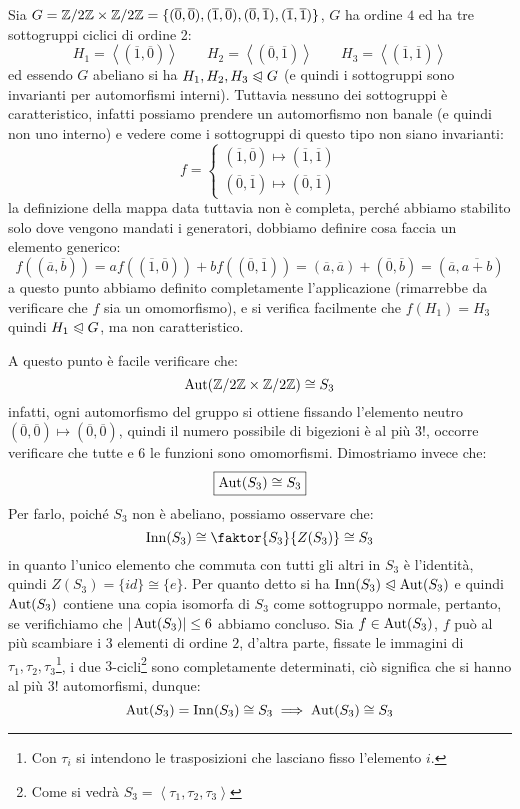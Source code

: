 \documentclass[11pt]{scrartcl}
\begin{document}
\begin{example}
    Sia $G = \mathbb{Z}/{2}\mathbb{Z} \times \mathbb{Z}/{2}\mathbb{Z} = \{(\overline 0, \overline 0),(\overline 1, \overline 0),(\overline 0, \overline 1),(\overline 1, \overline 1)\}$, $G$ ha ordine $4$ ed ha tre sottogruppi ciclici di ordine 2:
        \[ H_1 = \left<(\overline 1, \overline 0)\right> \qquad H_2 = \left<(\overline 0, \overline 1)\right> \qquad H_3 = \left<(\overline 1, \overline 1)\right>
            \] 
    ed essendo $G$ abeliano si ha $H_1,H_2,H_3 \trianglelefteqslant G$ (e quindi i sottogruppi sono invarianti per automorfismi interni). Tuttavia nessuno dei sottogruppi è caratteristico,
    infatti possiamo prendere un automorfismo non banale (e quindi non uno interno) e vedere come i sottogruppi di questo tipo non siano invarianti:
        \[ f = \begin{cases}
            (\overline 1, \overline 0) \longmapsto (\overline 1, \overline 1)\\
            (\overline 0, \overline 1) \longmapsto (\overline 0, \overline 1)
        \end{cases}
            \]
    la definizione della mappa data tuttavia non è completa, perché abbiamo stabilito solo dove vengono mandati i generatori, dobbiamo definire cosa faccia un elemento generico:
        \[ f ((\overline a, \overline b)) = af((\overline 1, \overline 0)) + bf((\overline 0, \overline 1)) = (\overline a, \overline a) + (\overline 0, \overline b) = (\overline a, \overline{a + b})
            \]
    a questo punto abbiamo definito completamente l'applicazione (rimarrebbe da verificare che $f$ sia un omomorfismo),  e si verifica facilmente che
     $f(H_1) = H_3 $ quindi $H_1 \trianglelefteqslant G$, ma non caratteristico.
\end{example}

A questo punto è facile verificare che:
    \[ \operatorname{Aut}(\mathbb{Z}/{2}\mathbb{Z} \times \mathbb{Z}/{2}\mathbb{Z}) \cong S_3
        \]
infatti, ogni automorfismo del gruppo si ottiene fissando l'elemento neutro $(\overline 0, \overline 0) \longmapsto (\overline 0, \overline 0)$, quindi il numero possibile di bigezioni è al più $3!$, occorre
verificare che tutte e $6$ le funzioni sono omomorfismi. Dimostriamo invece che:
    \[ \boxed{\operatorname{Aut}(S_3) \cong S_3}
        \]
Per farlo, poiché $S_3$ non è abeliano, possiamo osservare che:
    \[ \Inn(S_3) \cong \faktor{S_3}{Z(S_3)} \cong S_3
        \]
in quanto l'unico elemento che commuta con tutti gli altri in $S_3$ è l'identità, quindi $Z(S_3) = \{id\} \cong \{e\}$.
Per quanto detto si ha $\operatorname{Inn}(S_3) \trianglelefteqslant \operatorname{Aut}(S_3)$ e quindi $\operatorname{Aut}(S_3)$ contiene una copia isomorfa di $S_3$ come sottogruppo normale, pertanto,
se verifichiamo che $|\operatorname{Aut}(S_3)| \leq 6$ abbiamo concluso. Sia $f \in \operatorname{Aut}(S_3)$, $f$ può al più scambiare i $3$ elementi di ordine $2$, d'altra parte, fissate le 
immagini di $\tau_1,\tau_2,\tau_3$\footnote{Con $\tau_i$ si intendono le trasposizioni che lasciano fisso l'elemento $i$.}, i due 
$3$-cicli\footnote{Come si vedrà $S_3 = \left<\tau_1,\tau_2,\tau_3\right>$} sono completamente determinati,
ciò significa che si hanno al più $3!$ automorfismi, dunque:
    \[ \operatorname{Aut}(S_3) = \operatorname{Inn}(S_3) \cong S_3 \implies \operatorname{Aut}(S_3) \cong S_3 
        \]
\end{document}
